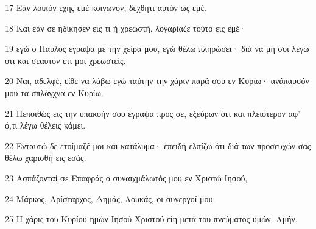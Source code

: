 \par 17 Εάν λοιπόν έχης εμέ κοινωνόν, δέχθητι αυτόν ως εμέ.
\par 18 Και εάν σε ηδίκησεν εις τι ή χρεωστή, λογαρίαζε τούτο εις εμέ·
\par 19 εγώ ο Παύλος έγραψα με την χείρα μου, εγώ θέλω πληρώσει· διά να μη σοι λέγω ότι και σεαυτόν έτι μοι χρεωστείς.
\par 20 Ναι, αδελφέ, είθε να λάβω εγώ ταύτην την χάριν παρά σου εν Κυρίω· ανάπαυσόν μου τα σπλάγχνα εν Κυρίω.
\par 21 Πεποιθώς εις την υπακοήν σου έγραψα προς σε, εξεύρων ότι και πλειότερον αφ' ό,τι λέγω θέλεις κάμει.
\par 22 Ενταυτώ δε ετοίμαζέ μοι και κατάλυμα· επειδή ελπίζω ότι διά των προσευχών σας θέλω χαρισθή εις εσάς.
\par 23 Ασπάζονταί σε Επαφράς ο συναιχμάλωτός μου εν Χριστώ Ιησού,
\par 24 Μάρκος, Αρίσταρχος, Δημάς, Λουκάς, οι συνεργοί μου.
\par 25 Η χάρις του Κυρίου ημών Ιησού Χριστού είη μετά του πνεύματος υμών. Αμήν.


